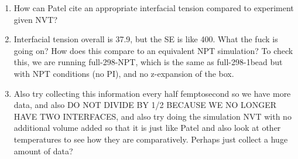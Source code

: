 \documentclass[12pt,reqno]{amsart}
\numberwithin{equation}{section}
\begin{document}
\begin{enumerate}
\item How can Patel cite an appropriate interfacial tension compared to experiment given NVT?

\item Interfacial tension overall is 37.9, but the SE is like 400.  What the fuck is going on?  How does this compare to an equivalent NPT simulation?  To check this, we are running full-298-NPT, which is the same as full-298-1bead but with NPT conditions (no PI), and no z-expansion of the box.  
\item Also try collecting this information every half femptosecond so we have more data, and also DO NOT DIVIDE BY 1/2 BECAUSE WE NO LONGER HAVE TWO INTERFACES, and also try doing the simulation NVT with no additional volume added so that it is just like Patel and also look at other temperatures to see how they are comparatively.  Perhaps just collect a huge amount of data?

\end{enumerate}
\end{document}
